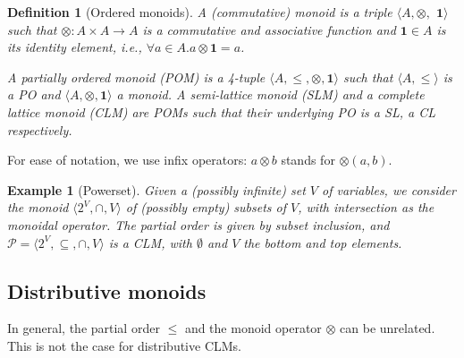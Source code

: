 \documentclass[a4paper]{elsarticle}
\newtheorem{definition}{Definition}
\newtheorem{example}{Example}
\newcommand{\monop}{\otimes}
\newcommand{\1}{\mathbf{1}}
\begin{document}
%
%

\begin{definition}[Ordered monoids]\label{defn:clm}
	A (commutative) monoid is a triple
	$\langle A, \monop,$ $\1 \rangle$ such that $\monop: A \times A \rightarrow A$ is
	a commutative and associative function and $\1 \in A$ is its \emph{identity} element,
	i.e., $\forall a \in A. a \monop \1 = a$.
	
	A partially ordered monoid (POM) is a 4-tuple
	$\langle A, \leq, \monop, \1 \rangle$ such that 	
	$\langle A, \leq \rangle$ is a PO and $\langle A, \monop, \1 \rangle$ a monoid.
	A semi-lattice monoid (SLM) and a complete lattice monoid (CLM) are 
	POMs such that their underlying PO is a SL, a CL respectively.
\end{definition}

For ease of notation, we use infix operators: $a \monop b$ stands for $\monop(a,b)$.

\begin{example}[Powerset]\label{ex:powerset}
	Given a (possibly infinite) set $V$ of variables, we consider
	the monoid $\langle 2^V, \cap, V \rangle$
	of (possibly empty) subsets of $V$, with intersection as the monoidal operator.
	The partial order is given by subset inclusion, and 
	$\mathcal{P} = \langle 2^V, \subseteq, \cap, V \rangle$
	is a CLM, with $\emptyset$ and $V$ the bottom and top elements. %
\end{example}

\subsection{Distributive monoids}

In general, the partial order $\leq$ and the monoid operator $\otimes$ can be unrelated.
This is not the case for distributive CLMs.
\end{document}
